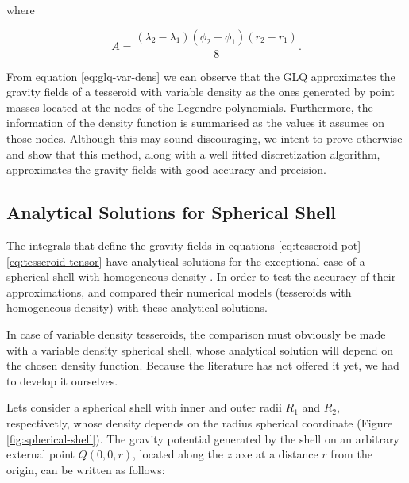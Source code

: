 \documentclass[extra]{gji}
\begin{document}
\noindent where

\begin{equation}
    A = 
    \frac{(\lambda_2 - \lambda_1)(\phi_2 - \phi_1)(r_2 - r_1)}{8}.
\end{equation}

From equation \ref{eq:glq-var-dens} we can observe that the GLQ approximates the gravity fields of a tesseroid with variable density as the ones generated by point masses located at the nodes of the Legendre polynomials.
Furthermore, the information of the density function is summarised as the values it assumes on those nodes.
Although this may sound discouraging, we intent to prove otherwise and show that this method, along with a well fitted discretization algorithm, approximates the gravity fields with good accuracy and precision.


\subsection{Analytical Solutions for Spherical Shell}

The integrals that define the gravity fields in equations \ref{eq:tesseroid-pot}-\ref{eq:tesseroid-tensor} have analytical solutions for the exceptional case of a spherical shell with homogeneous density \citep{Mikuska2006,Grombein2013}.
In order to test the accuracy of their approximations, \citet{Uieda2016} and \citet{Grombein2013} compared their numerical models (tesseroids with homogeneous density) with these analytical solutions.

In case of variable density tesseroids, the comparison must obviously be made with a variable density spherical shell, whose analytical solution will depend on the chosen density function.
Because the literature has not offered it yet, we had to develop it ourselves. 

Lets consider a spherical shell with inner and outer radii $R_1$ and $R_2$, respectivetly, whose density depends on the radius spherical coordinate (Figure \ref{fig:spherical-shell}).
The gravity potential generated by the shell on an arbitrary external point $Q(0,0,r)$, located along the $z$ axe at a distance $r$ from the origin, can be written as follows:
\end{document}
